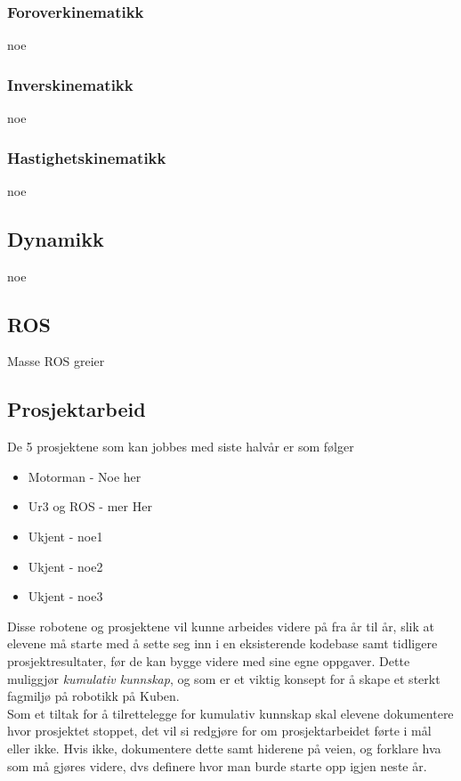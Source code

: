     \subsubsection{Foroverkinematikk}
        noe


    \subsubsection{Inverskinematikk}
        noe


    \subsubsection{Hastighetskinematikk}
        noe


\subsection{Dynamikk}
        noe



\subsection{ROS}
        Masse ROS greier

\subsection{Prosjektarbeid}

    De 5 prosjektene som kan jobbes med siste halvår er som følger
    \begin{itemize}
        \item Motorman - Noe her
        \item Ur3 og ROS - mer Her
        \item Ukjent - noe1
        \item Ukjent - noe2
        \item Ukjent - noe3
    \end{itemize}

    Disse robotene og prosjektene vil kunne arbeides videre på fra år til år, slik at elevene må starte med å sette seg inn i en eksisterende kodebase samt tidligere prosjektresultater, før de kan bygge videre med sine egne oppgaver. Dette muliggjør \emph{kumulativ kunnskap}, og som er et viktig konsept for å skape et sterkt fagmiljø på robotikk på Kuben.\\

    Som et tiltak for å tilrettelegge for kumulativ kunnskap skal elevene dokumentere hvor prosjektet stoppet, det vil si redgjøre for om prosjektarbeidet førte i mål eller ikke. Hvis ikke, dokumentere dette samt hiderene på veien, og forklare hva som må gjøres videre, dvs definere hvor man burde starte opp igjen neste år.
